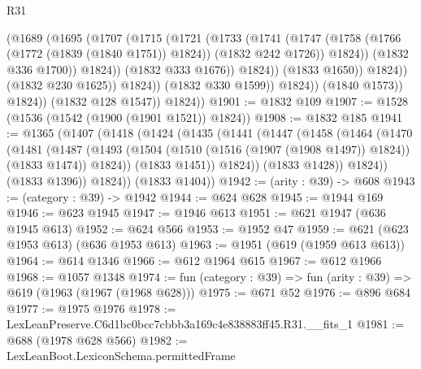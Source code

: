 \begin{lexlean}{R31}
\begin{coremodule}
                                  (@1689
                                    (@1695
                                      (@1707
                                        (@1715
                                          (@1721
                                            (@1733
                                              (@1741
                                                (@1747
                                                  (@1758
                                                    (@1766 (@1772 (@1839 (@1840 @1751)) @1824))
                                                    (@1832 @242 @1726))
                                                  @1824))
                                              (@1832 @336 @1700))
                                            @1824))
                                        (@1832 @333 @1676))
                                      @1824))
                                  (@1833 @1650))
                                @1824))
                            (@1832 @230 @1625))
                          @1824))
                      (@1832 @330 @1599))
                    @1824))
                (@1840 @1573))
              @1824))
          (@1832 @128 @1547))
        @1824))
@1901 := @1832 @109
@1907 := @1528 (@1536 (@1542 (@1900 (@1901 @1521)) @1824))
@1908 := @1832 @185
@1941 := @1365
    (@1407
      (@1418
        (@1424
          (@1435
            (@1441
              (@1447
                (@1458
                  (@1464
                    (@1470
                      (@1481
                        (@1487
                          (@1493
                            (@1504 (@1510 (@1516 (@1907 (@1908 @1497)) @1824)) (@1833 @1474))
                            @1824))
                        (@1833 @1451))
                      @1824))
                  (@1833 @1428))
                @1824))
            (@1833 @1396))
          @1824))
      (@1833 @1404))
@1942 := (arity : @39) -> @608
@1943 := (category : @39) -> @1942
@1944 := @624 @628
@1945 := @1944 @169
@1946 := @623 @1945
@1947 := @1946 @613
@1951 := @621 @1947 (@636 @1945 @613)
@1952 := @624 @566
@1953 := @1952 @47
@1959 := @621 (@623 @1953 @613) (@636 @1953 @613)
@1963 := @1951 (@619 (@1959 @613 @613))
@1964 := @614 @1346
@1966 := @612 @1964 @615
@1967 := @612 @1966
@1968 := @1057 @1348
@1974 := fun (category : @39) => fun (arity : @39) => @619 (@1963 (@1967 (@1968 @628)))
@1975 := @671 @52
@1976 := @896 @684
@1977 := @1975 @1976
@1978 := LexLeanPreserve.C6d1bc0bcc7cbbb3a169c4e838883ff45.R31.__fits_1
@1981 := @688 (@1978 @628 @566)
@1982 := LexLeanBoot.LexiconSchema.permittedFrame

\end{coremodule}
\end{lexlean}

